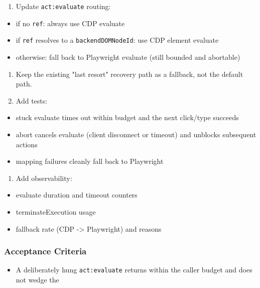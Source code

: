 \begin{enumerate}
  \item Update \texttt{act:evaluate} routing:
\end{enumerate}

\begin{itemize}
  \item if no \texttt{ref}: always use CDP evaluate
  \item if \texttt{ref} resolves to a \texttt{backendDOMNodeId}: use CDP element evaluate
  \item otherwise: fall back to Playwright evaluate (still bounded and abortable)
\end{itemize}

\begin{enumerate}
  \item Keep the existing "last resort" recovery path as a fallback, not the default path.
  \item Add tests:
\end{enumerate}

\begin{itemize}
  \item stuck evaluate times out within budget and the next click/type succeeds
  \item abort cancels evaluate (client disconnect or timeout) and unblocks subsequent actions
  \item mapping failures cleanly fall back to Playwright
\end{itemize}

\begin{enumerate}
  \item Add observability:
\end{enumerate}

\begin{itemize}
  \item evaluate duration and timeout counters
  \item terminateExecution usage
  \item fallback rate (CDP -> Playwright) and reasons
\end{itemize}


\subsubsection{Acceptance Criteria}


\begin{itemize}
  \item A deliberately hung \texttt{act:evaluate} returns within the caller budget and does not wedge the
\end{itemize}

